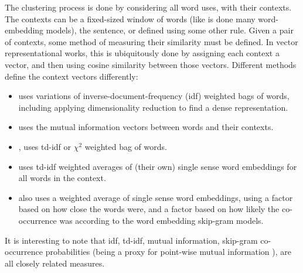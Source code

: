 \documentclass[12pt,parskip]{komatufte}
\begin{document}
The clustering process is done by considering all word uses, with their contexts.
The contexts can be a fixed-sized window of words (like is done many word-embedding models), the sentence, or defined using some other rule.
Given a pair of contexts, some method of measuring their similarity must be defined.
In vector representational works, this is ubiquitously done by assigning each context a vector, and then using cosine similarity between those vectors.
Different methods define the context vectors differently:
\begin{itemize}
\item \textcite{Schutze:1998wordsenseclustering} uses variations of inverse-document-frequency (idf) weighted bags of words, including applying dimensionality reduction to find a dense representation.
\item \textcite{pantel2002WSI} uses the mutual information vectors between words and their contexts.
\item \textcite{Reisinger2010}, uses td-idf or $\chi^2$ weighted bag of words.
\item {} uses td-idf weighted averages of (their own) single sense word embeddings for all words in the context.
\item  {} also uses a weighted average of single sense word embeddings, using a factor based on how close the words were, and a factor based on how likely the co-occurrence was according to the word embedding skip-gram models.

\end{itemize}
It is interesting to note that idf, td-idf, mutual information, skip-gram co-occurrence probabilities (being a proxy for point-wise mutual information \parencite{levy2014neural}), are all closely related measures.
\end{document}

